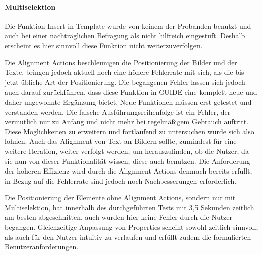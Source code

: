 \paragraph{Multiselektion}
Die Funktion \glqq Insert in Template\grqq{} wurde von keinem der Probanden benutzt und auch bei einer nachträglichen Befragung als nicht hilfreich eingestuft.
Deshalb erscheint es hier sinnvoll diese Funktion nicht weiterzuverfolgen.

Die Alignment Actions beschleunigen die Positionierung der Bilder und der Texte, bringen jedoch aktuell noch eine höhere Fehlerrate mit sich, als die bis jetzt übliche Art der Positionierung.
Die begangenen Fehler lassen sich jedoch auch darauf zurückführen, dass diese Funktion in GUIDE eine komplett neue und daher ungewohnte Ergänzung bietet.
Neue Funktionen müssen erst getestet und verstanden werden.
Die falsche Ausführungsreihenfolge ist ein Fehler, der vermutlich nur zu Anfang und nicht mehr bei regelmäßigem Gebrauch auftritt.
Diese Möglichkeiten zu erweitern und fortlaufend zu untersuchen würde sich also lohnen.
Auch das Alignment von Text an Bildern sollte, zumindest für eine weitere Iteration, weiter verfolgt werden, um herauszufinden, ob die Nutzer, da sie nun von dieser Funktionalität wissen, diese auch benutzen.
Die Anforderung der höheren Effizienz wird durch die Alignment Actions demnach bereits erfüllt, in Bezug auf die Fehlerrate sind jedoch noch Nachbesserungen erforderlich.

Die Positionierung der Elemente ohne Alignment Actions, sondern nur mit Multiselektion, hat innerhalb des durchgeführten Tests  mit 3,5 Sekunden zeitlich am besten abgeschnitten, auch wurden hier keine Fehler durch die Nutzer begangen.
Gleichzeitige Anpassung von Properties scheint sowohl zeitlich sinnvoll, als auch für den Nutzer intuitiv zu verlaufen und erfüllt zudem die formulierten Benutzeranforderungen.

